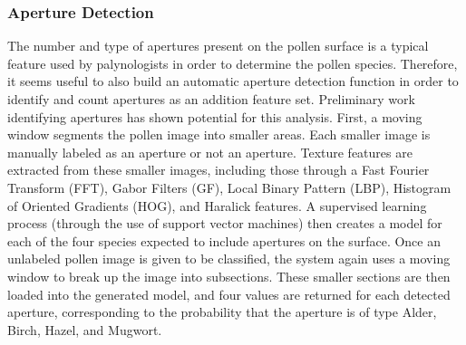 \subsubsection{Aperture Detection}

The number and type of apertures present on the pollen surface is a typical feature used by palynologists in order to determine the pollen species. Therefore, it seems useful to also build an automatic aperture detection function in order to identify and count apertures as an addition feature set. Preliminary work identifying apertures \cite{Lozano_2013_ICIAP} has shown potential for this analysis.
First, a moving window segments the pollen image into smaller areas. Each smaller image is manually labeled as an aperture or not an aperture. Texture features are extracted from these smaller images, including those through a Fast Fourier Transform (FFT), Gabor Filters (GF), Local Binary Pattern (LBP), Histogram of Oriented Gradients (HOG), and Haralick features. A supervised learning process (through the use of support vector machines) then creates a model for each of the four species expected to include apertures on the surface.
Once an unlabeled pollen image is given to be classified, the system again uses a moving window to break up the image into subsections. These smaller sections are then loaded into the generated model, and four values are returned for each detected aperture, corresponding to the probability that the aperture is of type Alder, Birch, Hazel, and Mugwort. 

    
    
  
  
  
  
  
  
  